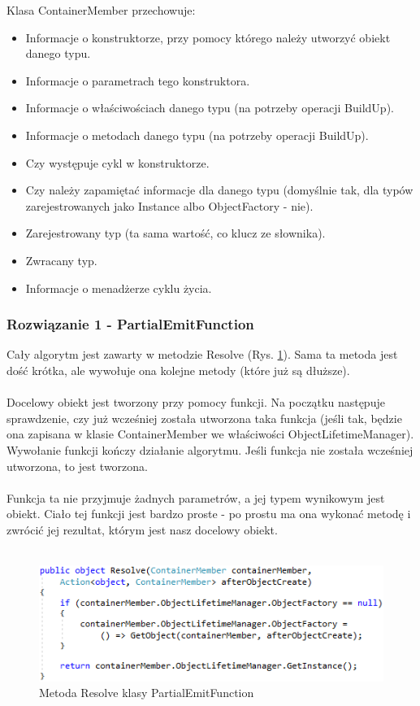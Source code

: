 \documentclass[12pt]{article}
\begin{document}
Klasa ContainerMember przechowuje:
\begin{itemize}
	\item Informacje o konstruktorze, przy pomocy którego należy utworzyć obiekt danego typu.
	\item Informacje o parametrach tego konstruktora.
	\item Informacje o właściwościach danego typu (na potrzeby operacji BuildUp).
	\item Informacje o metodach danego typu (na potrzeby operacji BuildUp).
	\item Czy występuje cykl w konstruktorze.
	\item Czy należy zapamiętać informacje dla danego typu (domyślnie tak, dla typów zarejestrowanych jako Instance albo ObjectFactory - nie).
	\item Zarejestrowany typ (ta sama wartość, co klucz ze słownika).
	\item Zwracany typ.
	\item Informacje o menadżerze cyklu życia.
\end{itemize}

\subsubsection{Rozwiązanie 1 - PartialEmitFunction}
Cały algorytm jest zawarty w metodzie Resolve (Rys. \ref{fig:PartialEmitFunction_Resolve}). Sama ta metoda jest dość krótka, ale wywołuje ona kolejne metody (które już są dłuższe).\\
\\
Docelowy obiekt jest tworzony przy pomocy funkcji. Na początku następuje sprawdzenie, czy już wcześniej została utworzona taka funkcja (jeśli tak, będzie ona zapisana w klasie ContainerMember we właściwości ObjectLifetimeManager). Wywołanie funkcji kończy działanie algorytmu. Jeśli funkcja nie została wcześniej utworzona, to jest tworzona.\\
\\
Funkcja ta nie przyjmuje żadnych parametrów, a jej typem wynikowym jest obiekt. Ciało tej funkcji jest bardzo proste - po prostu ma ona wykonać metodę i zwrócić jej rezultat, którym jest nasz docelowy obiekt.\\ \\
\begin{figure}[H]
	\begin{center}
  		\includegraphics{PartialEmitFunction_Resolve.png}
  		\caption{Metoda Resolve klasy PartialEmitFunction}
  		\label{fig:PartialEmitFunction_Resolve}
	\end{center}
\end{figure}
\end{document}
